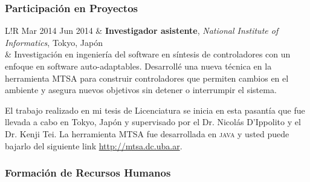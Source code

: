 \documentclass[10pt]{article}
\newcommand\VRule{\color{lightgray}\vrule width 0.5pt}
\begin{document}
\subsubsection*{Participación en Proyectos}

\begin{tabular}{L!{\VRule}R}
Mar 2014 Jun 2014 & \textbf{Investigador asistente}, \textit{National Institute of Informatics}, Tokyo, Japón\\
& \vspace{-0.7cm} Investigación en ingeniería del software en síntesis de controladores con un enfoque en software auto-adaptables.
Desarrollé una nueva técnica en la herramienta MTSA para construir controladores que permiten cambios en el ambiente y
asegura nuevos objetivos sin detener o interrumpir el sistema.

El trabajo realizado en mi tesis de Licenciatura se inicia en esta pasantía que fue llevada a cabo en Tokyo, Japón y
supervisado por el Dr. Nicolás D'Ippolito y el Dr. Kenji Tei. La herramienta MTSA fue desarrollada en \textsc{java} y
usted puede bajarlo del siguiente link \url{http://mtsa.dc.uba.ar}.\\
\end{tabular}

\subsubsection*{Formación de Recursos Humanos}
\end{document}
